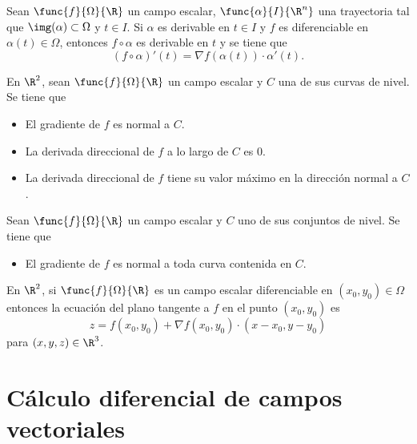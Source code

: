 \documentclass[a4,11pt]{aleph-notas}
\begin{document}
\begin{teo}
    Sean $\func{f}{\Omega}{\R}$ un campo escalar, $\func{\alpha}{I}{\R^n}$ una trayectoria tal que $\img(\alpha)\subset \Omega$ y $t\in I$. Si $\alpha$ es derivable en $t\in I$ y $f$ es diferenciable en $\alpha(t)\in\Omega$, entonces $f\circ \alpha$ es derivable en $t$ y se tiene que
    \[
        (f\circ \alpha)'(t) = \nabla f(\alpha(t))\cdot \alpha'(t).
    \]
\end{teo}

\begin{prop}
    En $\R^2$, sean $\func{f}{\Omega}{\R}$ un campo escalar y $C$ una de sus curvas de nivel. Se tiene que 
    \begin{itemize}
        \item El gradiente de $f$ es normal a $C$.
        \item La derivada direccional de $f$ a lo largo de $C$ es 0.
        \item La derivada direccional de $f$ tiene su valor máximo en la dirección normal a $C$.
    \end{itemize}
\end{prop}

\begin{prop}
    Sean $\func{f}{\Omega}{\R}$ un campo escalar y $C$ uno de sus conjuntos de nivel. Se tiene que 
    \begin{itemize}
        \item El gradiente de $f$ es normal a toda curva contenida en $C$.
    \end{itemize}
\end{prop}

\begin{advertencia}
	En $\R^2$, si $\func{f}{\Omega}{\R}$ es un campo escalar diferenciable en $(x_0,y_0)\in \Omega$ entonces la ecuación del plano tangente a $f$ en el punto $(x_0,y_0)$ es
    \[
    	z = f(x_0,y_0) + \nabla f(x_0,y_0) \cdot (x-x_0,y-y_0)
    \]
    para $(x,y,z)\in\R^3$.
\end{advertencia}


\section{Cálculo diferencial de campos vectoriales}

\end{document}
